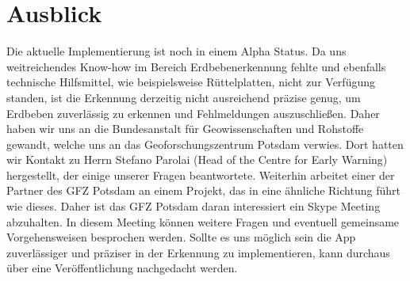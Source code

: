 \section{Ausblick}
Die aktuelle Implementierung ist noch in einem Alpha Status.
Da uns weitreichendes Know-how im Bereich Erdbebenerkennung fehlte und ebenfalls technische Hilfsmittel, wie beispielsweise Rüttelplatten, nicht zur Verfügung standen, ist die Erkennung derzeitig nicht ausreichend präzise genug, um Erdbeben zuverlässig zu erkennen und Fehlmeldungen auszuschließen. 
Daher haben wir uns an die Bundesanstalt für Geowissenschaften und Rohstoffe gewandt, welche uns an das Geoforschungszentrum Potsdam verwies.
Dort hatten wir Kontakt zu Herrn Stefano Parolai (Head of the Centre for Early Warning) hergestellt, der einige unserer Fragen beantwortete.
Weiterhin arbeitet einer der Partner des GFZ Potsdam an einem Projekt, das in eine ähnliche Richtung führt wie dieses. Daher ist das GFZ Potsdam daran interessiert ein Skype Meeting abzuhalten. 
In diesem Meeting können weitere Fragen und eventuell gemeinsame Vorgehensweisen besprochen werden.
Sollte es uns möglich sein die App zuverlässiger und präziser in der Erkennung zu implementieren, kann durchaus über eine Veröffentlichung nachgedacht werden.   